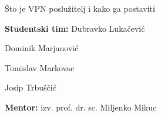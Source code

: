 \begin{titlepage}
	 \thispagestyle{empty}
	 \vspace*{5\baselineskip}
	 \centerline{\huge Što je VPN poslužitelj i kako ga postaviti}
	 \vspace*{3\baselineskip}
	 \centerline{\Large \textbf{Studentski tim:} Dubravko Lukačević }
	 \centerline{\hspace{4.7cm} \Large Dominik Marjanović }
	 \centerline{\hspace*{4.5cm} \Large Tomislav Markovac }
	 \centerline{\hspace{3.1cm} \Large Josip Trbuščić}
	 \vspace*{4\baselineskip}
	 \centerline{\Large \textbf{Mentor:} izv. prof. dr. sc. Miljenko Mikuc}
\end{titlepage}

